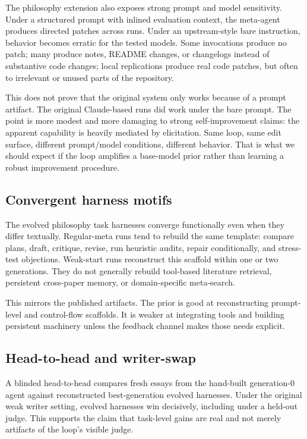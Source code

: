 \documentclass[11pt]{article}
\begin{document}
The philosophy extension also exposes strong prompt and model sensitivity. Under a structured prompt with inlined evaluation context, the meta-agent produces directed patches across runs. Under an upstream-style bare instruction, behavior becomes erratic for the tested models. Some invocations produce no patch; many produce notes, README changes, or changelogs instead of substantive code changes; local replications produce real code patches, but often to irrelevant or unused parts of the repository.

This does not prove that the original system only works because of a prompt artifact. The original Claude-based runs did work under the bare prompt. The point is more modest and more damaging to strong self-improvement claims: the apparent capability is heavily mediated by elicitation. Same loop, same edit surface, different prompt/model conditions, different behavior. That is what we should expect if the loop amplifies a base-model prior rather than learning a robust improvement procedure.

\subsection{Convergent harness motifs}\label{convergent-harness-motifs}

The evolved philosophy task harnesses converge functionally even when they differ textually. Regular-meta runs tend to rebuild the same template: compare plans, draft, critique, revise, run heuristic audits, repair conditionally, and stress-test objections. Weak-start runs reconstruct this scaffold within one or two generations. They do not generally rebuild tool-based literature retrieval, persistent cross-paper memory, or domain-specific meta-search.

This mirrors the published artifacts. The prior is good at reconstructing prompt-level and control-flow scaffolds. It is weaker at integrating tools and building persistent machinery unless the feedback channel makes those needs explicit.

\subsection{Head-to-head and writer-swap}\label{head-to-head-and-writer-swap}

A blinded head-to-head compares fresh essays from the hand-built generation-0 agent against reconstructed best-generation evolved harnesses. Under the original weak writer setting, evolved harnesses win decisively, including under a held-out judge. This supports the claim that task-level gains are real and not merely artifacts of the loop's visible judge.
\end{document}
